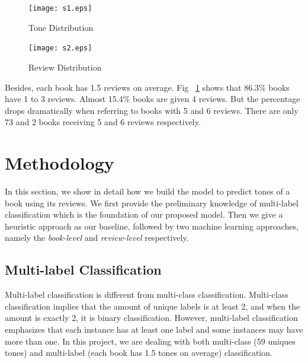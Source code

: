 \documentclass[runningheads]{llncs}
\begin{document}
\begin{figure}[!bh]
  \centering
  \begin{minipage}[b]{0.49\textwidth}
    \texttt{[image: s1.eps]}
    \caption{Tone Distribution}
    \label{fig1}
  \end{minipage}
  \hfill
  \begin{minipage}[b]{0.49\textwidth}
    \texttt{[image: s2.eps]}
    \caption{Review Distribution}
    \label{fig2}
  \end{minipage}
\end{figure}

Besides, each book has 1.5 reviews on average. Fig ~\ref{fig2} shows that 86.3\% books have 1 to 3 reviews. Almost 15.4\% books are given 4 reviews. But the percentage drops dramatically when referring to books with 5 and 6 reviews. There are only 73 and 2 books receiving 5 and 6 reviews respectively.

\section{Methodology}
In this section, we show in detail how we build the model to predict tones of a book using its reviews. We first provide the preliminary knowledge of multi-label classification which is the foundation of our proposed model. Then we give a heuristic approach as our baseline, followed by two machine learning approaches, namely the \emph{book-level} and \emph{review-level} respectively.

\subsection{Multi-label Classification}
Multi-label classification is different from multi-class classification. Multi-class classification implies that the amount of unique labels is at least 2, and when the amount is exactly 2, it is binary classification. However, multi-label classification emphasizes that each instance has at least one label and some instances may have more than one. In this project, we are dealing with both multi-class (59 uniques tones) and multi-label (each book has 1.5 tones on average) classification.
\end{document}
